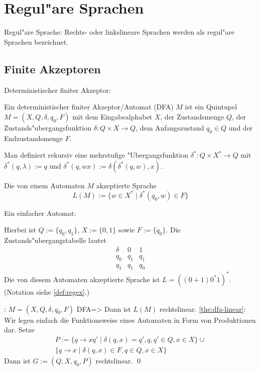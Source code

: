 \section{Regul"are Sprachen}
 Regul"are Sprache:{
  Rechts- oder linkslineare Sprachen werden als regul"are
  Sprachen bezeichnet.
  }
\subsection{Finite Akzeptoren}
 Deterministischer finiter Akzeptor:{
%
%
%
%
%
%
  Ein deterministischer finiter Akzeptor/Automat (DFA) $M$ ist ein Quintupel
  $M=(X,Q,\delta,q_0,F)$ mit dem Eingabealphabet $X$, der Zustandsmenge $Q$,
  der Zustands"ubergangsfunktion $\delta:Q\times X\to Q$, dem Anfangszustand 
  $q_0\in Q$ und der Endzustandsmenge $F$.
  
  Man definiert rekursiv eine mehrstufige "Ubergangsfunktion 
  $\delta^*:Q\times X^*\to Q$ mit $\delta^*(q,\lambda):=q$ und 
  $\delta^*(q,wx):=\delta(\delta^*(q, w),x)$.

  Die von einem Automaten $M$ akzeptierte Sprache 
  \[L(M):=\{w\in X^*\mid\delta^*(q_0, w)\in F\}
    \]
  }
\example Ein einfacher Automat:{
  
  Hierbei ist $Q := \{q_0, q_1\}$, $X := \{0, 1\}$ sowie $F := \{q_0\}$.
  Die Zustands"ubergangstabelle lautet
  \[\begin{array}{c|cc}
    \delta & 0 & 1 \\\hline
    q_0 & q_1 & q_1 \\
    q_1 & q_1 & q_0
    \end{array}\]
  Die von diesem Automaten akzeptierte Sprache ist $L = ((0 + 1)0^*1)^*$. 
  (Notation siehe \ref{def:regex}.)
  }
\theorem: $M=(X,Q,\delta,q_0,F)$ DFA=>{
  \label{the:dfa-linear}
  Dann ist $L(M)$ rechtslinear.
  }
\proof \ref{the:dfa-linear}:{
  Wir legen einfach die Funktionsweise eines Automaten in Form von 
  Produktionen dar. Setze 
  \begin{multline*}
    P:=\{q\to xq'\mid\delta(q, x)=q',q,q'\in Q,x\in X\}\cup  \\
    \{q\to x\mid\delta(q, x)\in F,q\in Q,x\in X\}
    \end{multline*}
  Dann ist $G:=(Q,X,q_0,P)$ rechtslinear. \qed
  }
